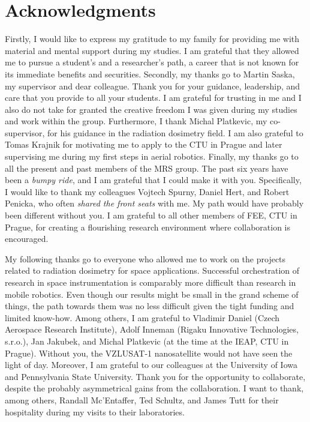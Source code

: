 
\section*{Acknowledgments}

Firstly, I would like to express my gratitude to my family for providing me with material and mental support during my studies.
I am grateful that they allowed me to pursue a student's and a researcher's path, a career that is not known for its immediate benefits and securities.
Secondly, my thanks go to Martin Saska, my supervisor and dear colleague.
Thank you for your guidance, leadership, and care that you provide to all your students.
I am grateful for trusting in me and I also do not take for granted the creative freedom I was given during my studies and work within the group.
Furthermore, I thank Michal Platkevic, my co-supervisor, for his guidance in the radiation dosimetry field.
I am also grateful to Tomas Krajnik for motivating me to apply to the CTU in Prague and later supervising me during my first steps in aerial robotics.
Finally, my thanks go to all the present and past members of the MRS group.
The past six years have been a \emph{bumpy ride}, and I am grateful that I could make it with you.
Specifically, I would like to thank my colleagues Vojtech Spurny, Daniel Hert, and Robert Penicka, who often \emph{shared the front seats} with me.
My path would have probably been different without you.
I am grateful to all other members of FEE, CTU in Prague, for creating a flourishing research environment where collaboration is encouraged.

My following thanks go to everyone who allowed me to work on the projects related to radiation dosimetry for space applications.
Successful orchestration of research in space instrumentation is comparably more difficult than research in mobile robotics.
Even though our results might be small in the grand scheme of things, the path towards them was no less difficult given the tight funding and limited know-how.
Among others, I am grateful to Vladimir Daniel (Czech Aerospace Research Institute), Adolf Inneman (Rigaku Innovative Technologies, s.r.o.), Jan Jakubek, and Michal Platkevic (at the time at the IEAP, CTU in Prague).
Without you, the VZLUSAT-1 nanosatellite would not have seen the light of day.
Moreover, I am grateful to our colleagues at the University of Iowa and Pennsylvania State University.
Thank you for the opportunity to collaborate, despite the probably asymmetrical gains from the collaboration.
I want to thank, among others, Randall Mc'Entaffer, Ted Schultz, and James Tutt for their hospitality during my visits to their laboratories.

